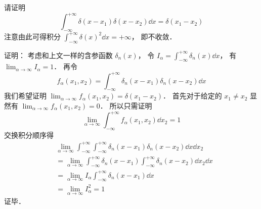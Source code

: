 \begin{example}{}
请证明
\begin{equation}
\int_{-\infty}^{+\infty} \delta(x-x_1) \delta(x-x_2) \dd{x} = \delta(x_1 - x_2)
\end{equation}
注意由此可得积分 $\int_{-\infty}^{+\infty}\delta(x)^2 \dd{x} = +\infty$， 即不收敛．

证明： 考虑和上文一样的含参函数 $\delta_n(x)$， 令 $I_\alpha = \int_{-\infty}^{+\infty} \delta_n(x) \dd{x}$， 有 $\lim_{\alpha\to\infty} I_\alpha = 1$． 再令
\begin{equation}
f_\alpha(x_1, x_2) = \int_{-\infty}^{+\infty} \delta_n(x-x_1) \delta_n(x-x_2) \dd{x}
\end{equation}
我们希望证明 $\lim_{\alpha\to\infty }f_\alpha(x_1, x_2) = \delta(x_1 - x_2)$． 首先对于给定的 $x_1 \ne x_2$ 显然有 $\lim_{\alpha\to\infty }f_\alpha(x_1, x_2) = 0$． 所以只需证明
\begin{equation}
\lim_{\alpha\to\infty }\int_{-\infty}^{+\infty} f_\alpha(x_1, x_2) \dd{x_2} = 1
\end{equation}
交换积分顺序得
\begin{equation}
\begin{aligned}
&\lim_{\alpha\to\infty }\int_{-\infty}^{+\infty}\int_{-\infty}^{+\infty} \delta_n(x-x_1) \delta_n(x-x_2) \dd{x}\dd{x_2}\\
&= \lim_{\alpha\to\infty }\int_{-\infty}^{+\infty} \delta_n(x-x_1) \int_{-\infty}^{+\infty} \delta_n(x-x_2)\dd{x_2} \dd{x}\\
&= \lim_{\alpha\to\infty } I_\alpha \int_{-\infty}^{+\infty} \delta_n(x-x_1)\dd{x}\\
&= \lim_{\alpha\to\infty } I_\alpha^2 = 1
\end{aligned}
\end{equation}
证毕．
\end{example}
